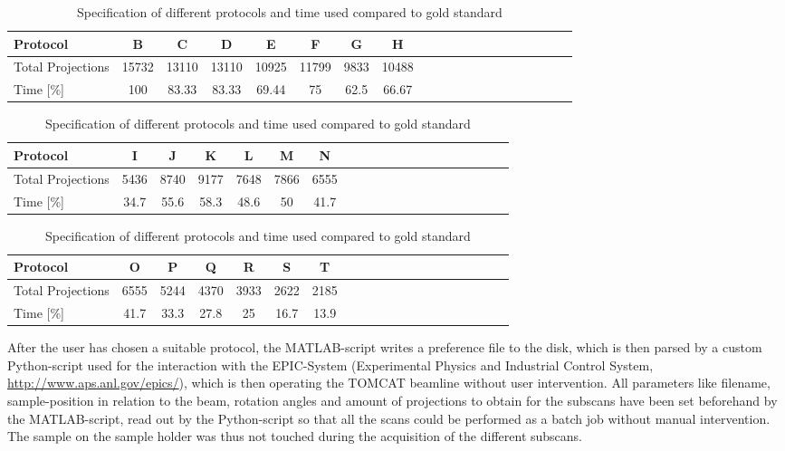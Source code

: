 \begin{table}
\centering
	\caption{Specification of different protocols and time used compared to gold standard}
	\begin{tabular*}{\textwidth}{l@{\extracolsep\fill}ccccccccccccccccccc}
		\toprule
		Protocol 			& B & C & D & E & F & G & H\\
		\midrule
		Total Projections 	& 15732 & 13110 & 13110 & 10925 & 11799 & 9833 & 10488\\
		Time [\%] 			& 100 & 83.33 & 83.33 & 69.44 & 75 & 62.5 & 66.67\\
	\end{tabular*}
	\begin{tabular*}{\textwidth}{l@{\extracolsep\fill}ccccccccccccccccccc}
		\toprule
		Protocol 			& I & J & K & L & M & N \\
		\midrule
		Total Projections 	& 5436 & 8740 & 9177 & 7648 & 7866 & 6555 \\
		Time [\%] 			& 34.7 & 55.6 & 58.3 & 48.6 & 50 & 41.7 \\
	\end{tabular*}
	\begin{tabular*}{\textwidth}{l@{\extracolsep\fill}ccccccccccccccccccc}
		\toprule
		Protocol 			& O & P & Q & R & S & T \\
		\midrule
		Total Projections 	& 6555 & 5244 & 4370 & 3933 & 2622 & 2185 \\
		Time [\%] 			& 41.7 & 33.3 & 27.8 & 25 & 16.7 & 13.9 \\
		\bottomrule
	\end{tabular*}
	\label{tab:projections}
\end{table}

After the user has chosen a suitable protocol, the MATLAB-script writes a preference file to the disk, which is then parsed by a custom Python-script used for the interaction with the EPIC-System (Experimental Physics and Industrial Control System, \url{http://www.aps.anl.gov/epics/}), which is then operating the TOMCAT beamline without user intervention. All parameters like filename, sample-position in relation to the beam, rotation angles and amount of projections to obtain for the subscans have been set beforehand by the MATLAB-script, read out by the Python-script so that all the scans could be performed as a batch job without manual intervention. The sample on the sample holder was thus not touched during the acquisition of the different subscans. 


